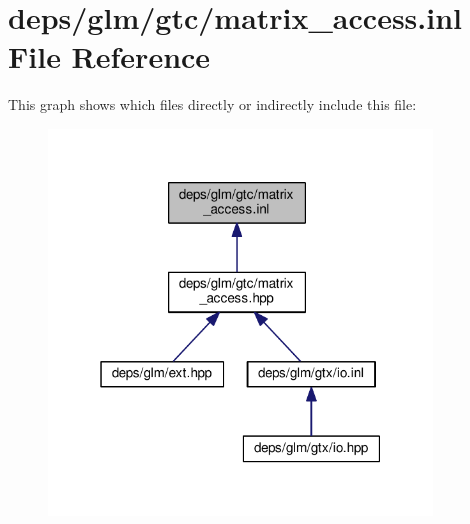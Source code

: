 \hypertarget{matrix__access_8inl}{}\section{deps/glm/gtc/matrix\+\_\+access.inl File Reference}
\label{matrix__access_8inl}
This graph shows which files directly or indirectly include this file\+:
\nopagebreak
\begin{figure}[H]
\begin{center}
\leavevmode
\includegraphics[width=289pt]{db/dfd/matrix__access_8inl__dep__incl}
\end{center}
\end{figure}
